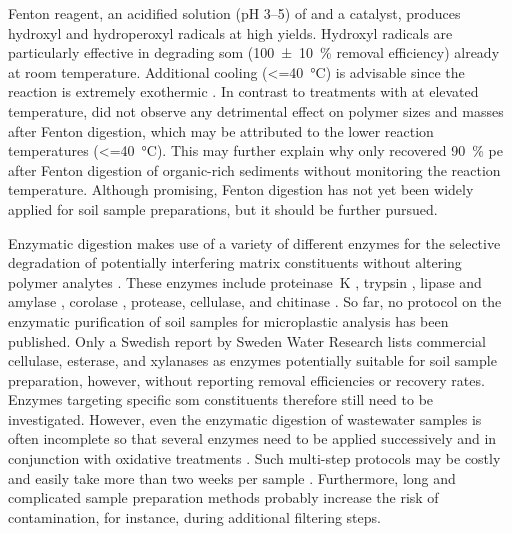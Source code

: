 Fenton reagent, an acidified solution (pH \numrange{3}{5}) of  and a  catalyst, produces hydroxyl and hydroperoxyl radicals at high yields.
Hydroxyl radicals are particularly effective in degrading \ac{som} (\SI{100(10)}{\percent} removal efficiency) already at room temperature. Additional cooling (\SI{<=40}{\degreeCelsius}) is advisable since the reaction is extremely exothermic \citep{HurleyValidation2018}.
In contrast to treatments with  at elevated temperature, \citet{HurleyValidation2018} did not observe any detrimental effect on polymer sizes and masses after Fenton digestion, which may be attributed to the lower reaction temperatures (\SI{<=40}{\degreeCelsius}). This may further explain why \citet{VermeirenMicroplastic2020} only recovered \SI{90}{\percent} \ac{pe} after Fenton digestion of organic-rich sediments without monitoring the reaction temperature. Although promising, Fenton digestion has not yet been widely applied for soil sample preparations, but it should be further pursued.

Enzymatic digestion makes use of a variety of different enzymes for the selective degradation of potentially interfering matrix constituents without altering polymer analytes \citep{LiuAnalytical2020}. These enzymes include proteinase~K \citep{ColeIsolation2014}, trypsin \citep{Courtene-JonesOptimisation2017}, lipase and amylase \citep{RailoApplication2018}, corolase \citep{LaversDetection2019}, protease, cellulase, and chitinase \citep{LoderEnzymatic2017}. So far, no protocol on the enzymatic purification of soil samples for microplastic analysis has been published. Only a Swedish report by Sweden Water Research \citep{LjungMicroplastics2018} lists commercial cellulase, esterase, and xylanases as enzymes potentially suitable for soil sample preparation, however, without reporting removal efficiencies or recovery rates.
Enzymes targeting specific \ac{som} constituents therefore still need to be investigated. However, even the enzymatic digestion of wastewater samples is often incomplete so that several enzymes need to be applied successively and in conjunction with oxidative treatments \citep{LoderEnzymatic2017,MintenigIdentification2017}. Such multi-step protocols may be costly and easily take more than two weeks per sample \citep{LoderEnzymatic2017}.
Furthermore, long and complicated sample preparation methods probably increase the risk of contamination, for instance, during additional filtering steps.

